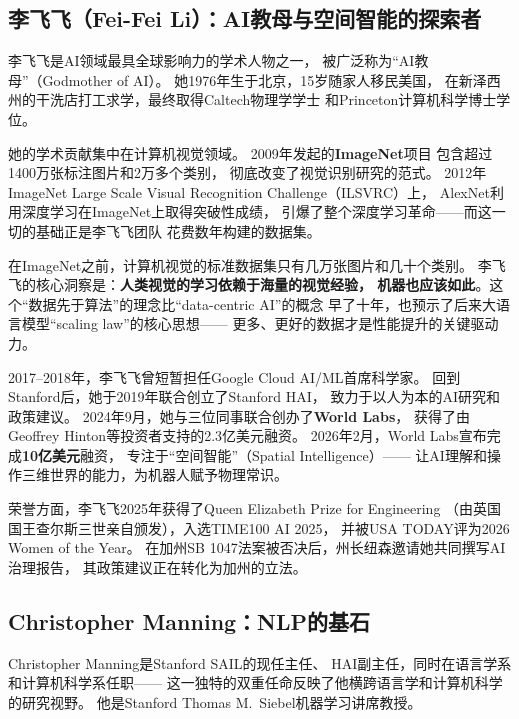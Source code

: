 \subsection{李飞飞（Fei-Fei Li）：AI教母与空间智能的探索者}

李飞飞是AI领域最具全球影响力的学术人物之一，
被广泛称为``AI教母''（Godmother of AI）。
她1976年生于北京，15岁随家人移民美国，
在新泽西州的干洗店打工求学，最终取得Caltech物理学学士
和Princeton计算机科学博士学位。

她的学术贡献集中在计算机视觉领域。
2009年发起的\textbf{ImageNet}项目
包含超过1400万张标注图片和2万多个类别，
彻底改变了视觉识别研究的范式。
2012年ImageNet Large Scale Visual Recognition Challenge（ILSVRC）上，
AlexNet利用深度学习在ImageNet上取得突破性成绩，
引爆了整个深度学习革命——而这一切的基础正是李飞飞团队
花费数年构建的数据集。

\begin{whybox}[为什么ImageNet如此重要？]
在ImageNet之前，计算机视觉的标准数据集只有几万张图片和几十个类别。
李飞飞的核心洞察是：\textbf{人类视觉的学习依赖于海量的视觉经验，
机器也应该如此}。这个``数据先于算法''的理念比``data-centric AI''的概念
早了十年，也预示了后来大语言模型``scaling law''的核心思想——
更多、更好的数据才是性能提升的关键驱动力。
\end{whybox}

2017--2018年，李飞飞曾短暂担任Google Cloud AI/ML首席科学家。
回到Stanford后，她于2019年联合创立了Stanford HAI，
致力于以人为本的AI研究和政策建议。
2024年9月，她与三位同事联合创办了\textbf{World Labs}，
获得了由Geoffrey Hinton等投资者支持的2.3亿美元融资。
2026年2月，World Labs宣布完成\textbf{10亿美元}融资，
专注于``空间智能''（Spatial Intelligence）——
让AI理解和操作三维世界的能力，为机器人赋予物理常识。

荣誉方面，李飞飞2025年获得了Queen Elizabeth Prize for Engineering
（由英国国王查尔斯三世亲自颁发），入选TIME100 AI 2025，
并被USA TODAY评为2026 Women of the Year。
在加州SB 1047法案被否决后，州长纽森邀请她共同撰写AI治理报告，
其政策建议正在转化为加州的立法。

\subsection{Christopher Manning：NLP的基石}

Christopher Manning是Stanford SAIL的现任主任、
HAI副主任，同时在语言学系和计算机科学系任职——
这一独特的双重任命反映了他横跨语言学和计算机科学的研究视野。
他是Stanford Thomas M.\ Siebel机器学习讲席教授。

